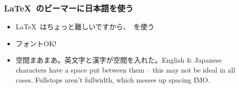 \begin{frame}
\frametitle{\LaTeX\ のビーマーに日本語を使う}
\begin{itemize}
    \item \LaTeX\ はちょっと難しいですから、\XeLaTeX\ を使う
    \item フォントOK!
    \item 空間まあまあ。英文字と漢字が空間を入れた。English \& Japanese
          characters have a space put between them -- this may not be ideal in
          all cases. Fullstops aren't fullwidth, which messes up spacing IMO.
\end{itemize}
\end{frame}
